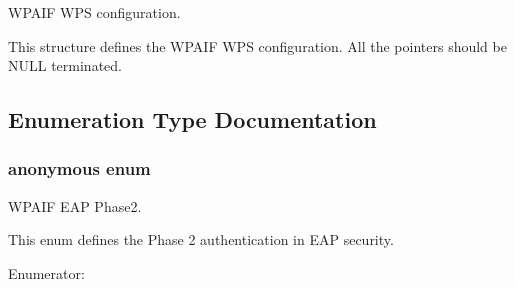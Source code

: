 WPAIF WPS configuration. 

This structure defines the WPAIF WPS configuration. All the pointers should be NULL terminated. 

\subsection{Enumeration Type Documentation}
\hypertarget{a00687_ga80155586fa275b28773c9b203f52caba}{
\subsubsection[{"@17}]{\setlength{\rightskip}{0pt plus 5cm}anonymous enum}}
\label{a00687_ga80155586fa275b28773c9b203f52caba}


WPAIF EAP Phase2. 

This enum defines the Phase 2 authentication in EAP security. \begin{Desc}
\item[Enumerator: ]\par
\begin{description}
\item[{\em 
\hypertarget{a00687_gga80155586fa275b28773c9b203f52cabaa57ccee1d732b55d646bb693db54c68b3}{
GSN\_\-WPAIF\_\-EAP\_\-CHAP}
\label{a00687_gga80155586fa275b28773c9b203f52cabaa57ccee1d732b55d646bb693db54c68b3}
}]\item[{\em 
\hypertarget{a00687_gga80155586fa275b28773c9b203f52cabaa5d6fefd10ba8ff083da0148f8bf64dd7}{
GSN\_\-WPAIF\_\-EAP\_\-MSCHAP}
\label{a00687_gga80155586fa275b28773c9b203f52cabaa5d6fefd10ba8ff083da0148f8bf64dd7}
}]\item[{\em 
\hypertarget{a00687_gga80155586fa275b28773c9b203f52cabaa2711360a255c4e42bbf0a9100905336c}{
GSN\_\-WPAIF\_\-EAP\_\-EAP}
\label{a00687_gga80155586fa275b28773c9b203f52cabaa2711360a255c4e42bbf0a9100905336c}
}]\item[{\em 
\hypertarget{a00687_gga80155586fa275b28773c9b203f52cabaa597f80719023ea574e28f5a25679f284}{
GSN\_\-WPAIF\_\-EAP\_\-PAP}
\label{a00687_gga80155586fa275b28773c9b203f52cabaa597f80719023ea574e28f5a25679f284}
}]\end{description}
\end{Desc}



